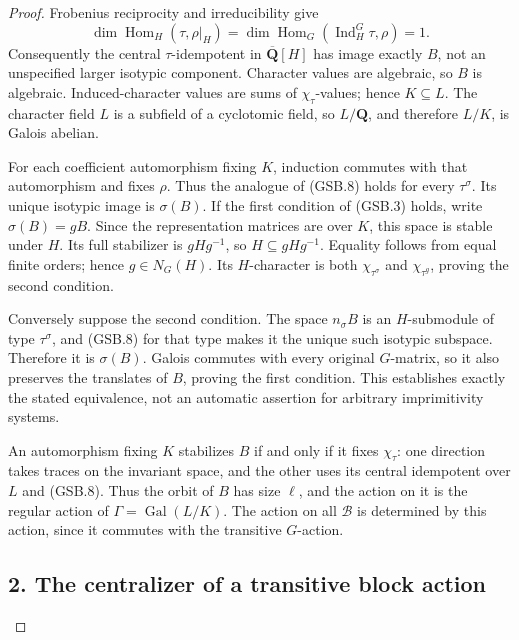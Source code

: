 \begin{proof}
Frobenius reciprocity and irreducibility give
\[
 \dim\operatorname{Hom}_H(\tau,\rho|_H)
   =\dim\operatorname{Hom}_G(\operatorname{Ind}_H^G\tau,\rho)=1.
 \tag{GSB.8}
\]
Consequently the central \(\tau\)-idempotent in
\(\overline{\mathbf Q}[H]\) has image exactly \(B\), not an
unspecified larger isotypic component. Character values are algebraic,
so \(B\) is algebraic. Induced-character values are sums of
\(\chi_\tau\)-values; hence \(K\subseteq L\). The character field
\(L\) is a subfield of a cyclotomic field, so \(L/\mathbf Q\),
and therefore \(L/K\), is Galois abelian.

For each coefficient automorphism fixing \(K\), induction commutes
with that automorphism and fixes \(\rho\). Thus the analogue of
(GSB.8) holds for every \(\tau^\sigma\). Its unique isotypic image
is \(\sigma(B)\). If the first condition of (GSB.3) holds, write
\(\sigma(B)=gB\). Since the representation matrices are over \(K\),
this space is stable under \(H\). Its full stabilizer is
\(gHg^{-1}\), so \(H\subseteq gHg^{-1}\). Equality follows from
equal finite orders; hence \(g\in N_G(H)\). Its \(H\)-character
is both \(\chi_{\tau^\sigma}\) and \(\chi_{\tau^g}\), proving
the second condition.

Conversely suppose the second condition. The space \(n_\sigma B\)
is an \(H\)-submodule of type \(\tau^\sigma\), and (GSB.8) for that
type makes it the unique such isotypic subspace. Therefore it is
\(\sigma(B)\). Galois commutes with every original \(G\)-matrix,
so it also preserves the translates of \(B\), proving the first
condition. This establishes exactly the stated equivalence, not an
automatic assertion for arbitrary imprimitivity systems.

An automorphism fixing \(K\) stabilizes \(B\) if and only if it fixes
\(\chi_\tau\): one direction takes traces on the invariant space,
and the other uses its central idempotent over \(L\) and (GSB.8).
Thus the orbit of \(B\) has size \(\ell\), and the action on it is
the regular action of \(\Gamma=\operatorname{Gal}(L/K)\). The action
on all \(\mathcal B\) is determined by this action, since it commutes
with the transitive \(G\)-action.

\subsection*{2. The centralizer of a transitive block action}


\end{proof}
